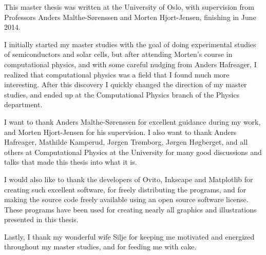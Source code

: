 \begin{acknowledgements}
This master thesis was written at the University of Oslo, with supervision from Professors Anders Malthe-Sørenssen and Morten Hjort-Jensen, finishing in June 2014.

I initially started my master studies with the goal of doing experimental studies of semiconductors and solar cells, but after attending Morten's course in computational physics, and with some careful nudging from Anders Hafreager, I realized that computational physics was a field that I found much more interesting. After this discovery I quickly changed the direction of my master studies, and ended up at the Computational Physics branch of the Physics department.

I want to thank Anders Malthe-Sørenssen for excellent guidance during my work, and Morten Hjort-Jensen for his supervision. I also want to thank Anders Hafreager, Mathilde Kamperud, Jørgen Trømborg, Jørgen Høgberget, and all others at Computational Physics at the University for many good discussions and talks that made this thesis into what it is.

I would also like to thank the developers of Ovito\cite{stukowski2010ovito}, Inkscape\cite{webinkscape} and Matplotlib for creating such excellent software, for freely distributing the programs, and for making the source code freely available using an open source software license. These programs have been used for creating nearly all graphics and illustrations presented in this thesis.

Lastly, I thank my wonderful wife Silje for keeping me motivated and energized throughout my master studies, and for feeding me with cake.



\end{acknowledgements}
